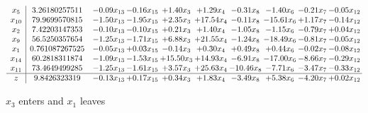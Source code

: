 \documentclass[9pt]{article}
\begin{document}
 \[\begin{array}{c| c c@{\hskip 2pt} c@{\hskip 2pt} c@{\hskip 2pt} c@{\hskip 2pt} c@{\hskip 2pt} c@{\hskip 2pt} c@{\hskip 2pt} c@{\hskip 2pt} }
 x_{5}   &  3.26180257511 & -0.09 x_{13} & -0.16 x_{15} & +  1.40 x_{3} & +  1.29 x_{4} & -0.31 x_{8} & -1.40 x_{6} & -0.21 x_{7} & -0.05 x_{12}\\
 x_{10}   &  79.9699570815 & -1.50 x_{13} & -1.95 x_{15} & +  2.35 x_{3} & + 17.54 x_{4} & -0.11 x_{8} & -15.61 x_{6} & +  1.17 x_{7} & -0.14 x_{12}\\
 x_{2}   &  7.42203147353 & -0.10 x_{13} & -0.10 x_{15} & +  0.21 x_{3} & +  1.40 x_{4} & -1.05 x_{8} & -1.15 x_{6} & -0.79 x_{7} & +  0.04 x_{12}\\
 x_{9}   &  56.5250357654 & -1.25 x_{13} & -1.71 x_{15} & +  6.88 x_{3} & + 21.55 x_{4} & -1.24 x_{8} & -18.49 x_{6} & -0.81 x_{7} & -0.05 x_{12}\\
 x_{1}   &  0.761087267525 & -0.05 x_{13} & +  0.03 x_{15} & -0.14 x_{3} & +  0.30 x_{4} & +  0.49 x_{8} & +  0.44 x_{6} & -0.02 x_{7} & -0.08 x_{12}\\
 x_{14}   &  60.2818311874 & -1.09 x_{13} & -1.53 x_{15} & + 15.50 x_{3} & + 14.93 x_{4} & -6.91 x_{8} & -17.00 x_{6} & -8.66 x_{7} & -0.29 x_{12}\\
 x_{11}   &  73.4649499285 & -1.25 x_{13} & -1.61 x_{15} & +  3.57 x_{3} & + 25.63 x_{4} & -10.46 x_{8} & -7.71 x_{6} & -3.47 x_{7} & -0.33 x_{12}\\
\hline
z    &  9.8426323319 & -0.13 x_{13} & +  0.17 x_{15} & +  0.34 x_{3} & +  1.83 x_{4} & -3.49 x_{8} & +  5.38 x_{6} & -4.20 x_{7} & +  0.02 x_{12}\\
\end{array}\]


 $ x_{3} $ enters and $ x_{1} $ leaves 
\end{document}
